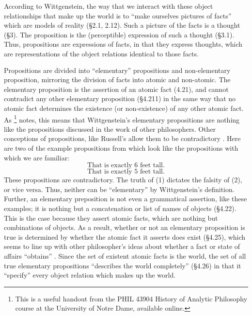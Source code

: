\documentclass[12pt]{apa}
\begin{document}
According to Wittgenstein, the way that we interact with these object
relationships that make up the world is to ``make ourselves pictures of facts''
which are models of reality (\S 2.1, 2.12). Such a picture of the facts is a
thought (\S 3). The proposition is the (perceptible) expression of such a
thought (\S 3.1). Thus, propositions are expressions of facts, in that they
express thoughts, which are representations of the object relations identical
to those facts.

Propositions are divided into ``elementary'' propositions and non-elementary
proposition, mirroring the division of facts into atomic and non-atomic. The
elementary proposition is the assertion of an atomic fact (4.21), and cannot
contradict any other elementary proposition (\S 4.211) in the same way that no
atomic fact determines the existence (or non-existence) of any other atomic
fact. As \footnote{This is a useful handout from the PHIL 43904
History of Analytic Philosophy course at the University of Notre Dame,
available online.} notes, this means that Wittgenstein's elementary
propositions are nothing like the propositions discussed in the work of other
philosophers. Other conceptions of propositions, like Russell's allow them to
be contradictory \cite{Klement15}. Here are two of the example propositions
from  which look like the propositions with which we are
familiar:    
\begin{equation}
\text{That is exactly 6 feet tall.}
\end{equation}
\begin{equation}
\text{That is exactly 5 feet tall.}
\end{equation}
These propositions are contradictory. The truth of (1) dictates the falsity of
(2), or vice versa. Thus, neither can be ``elementary'' by Wittgenstein's
definition. Further, an elementary preposition is not even a grammatical
assertion, like these examples; it is nothing but a concatenation or list of
names of objects (\S 4.22). This is the case because they assert atomic facts,
which are nothing but combinations of objects. As a result, whether or not an
elementary proposition is true is determined by whether the atomic fact it
asserts does exist (\S 4.25), which seems to line up with other philosopher's
ideas about whether a fact or state of affairs ``obtains'' \cite{Mulligan13}.
Since the set of existent atomic facts is the world, the set of all true
elementary propositions “describes the world completely” (\S 4.26) in that it
``specify'' every object relation which makes up the world.
\end{document}
